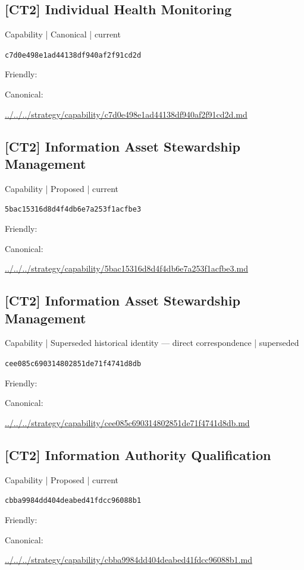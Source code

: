 \documentclass[10pt,a4paper]{article}
\begin{document}
\subsection*{[CT2] Individual Health Monitoring}
{\small Capability | Canonical | current}\par
\texttt{c7d0e498e1ad44138df940af2f91cd2d}\par
Friendly: \par
Canonical: \par
{\footnotesize\url{../../../strategy/capability/c7d0e498e1ad44138df940af2f91cd2d.md}}\par
\subsection*{[CT2] Information Asset Stewardship Management}
{\small Capability | Proposed | current}\par
\texttt{5bac15316d8d4f4db6e7a253f1acfbe3}\par
Friendly: \par
Canonical: \par
{\footnotesize\url{../../../strategy/capability/5bac15316d8d4f4db6e7a253f1acfbe3.md}}\par
\subsection*{[CT2] Information Asset Stewardship Management}
{\small Capability | Superseded historical identity — direct correspondence | superseded}\par
\texttt{cee085c690314802851de71f4741d8db}\par
Friendly: \par
Canonical: \par
{\footnotesize\url{../../../strategy/capability/cee085c690314802851de71f4741d8db.md}}\par
\subsection*{[CT2] Information Authority Qualification}
{\small Capability | Proposed | current}\par
\texttt{cbba9984dd404deabed41fdcc96088b1}\par
Friendly: \par
Canonical: \par
{\footnotesize\url{../../../strategy/capability/cbba9984dd404deabed41fdcc96088b1.md}}\par
\end{document}
